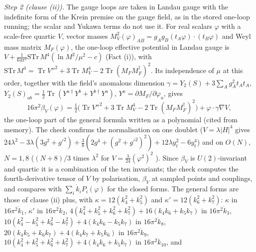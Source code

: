 \emph{Step 2 (clause (ii)).} The gauge loops are taken in Landau gauge with the indefinite form of the Krein premise  on the gauge field, as in the stored one-loop running; the scalar and Yukawa terms do not use it. For real scalars $\varphi$ with a scale-free quartic $V$, vector masses $M_{V}^{2}(\varphi)_{AB} = g_{A}g_{B}(t_{A}\varphi)\cdot(t_{B}\varphi)$ and Weyl mass matrix $M_{F}(\varphi)$, the one-loop effective potential in Landau gauge is $V + \tfrac{1}{64\pi^{2}}\mathrm{STr}\,M^{4}(\ln M^{2}/\mu^{2} - c)$ (Fact (i)), with $\mathrm{STr}\,M^{4} = \operatorname{Tr}V''^{2} + 3\operatorname{Tr}M_{V}^{4} - 2\operatorname{Tr}(M_{F}M_{F}^{\dagger})^{2}$. Its independence of $\mu$ at this order, together with the field's anomalous dimension $\gamma = Y_{2}(S) + 3\sum_{A}g_{A}^{2}t_{A}t_{A}$, $Y_{2}(S)_{ab} = \tfrac12\operatorname{Tr}(Y^{a\dagger}Y^{b} + Y^{b\dagger}Y^{a})$, $Y^{a} = \partial M_{F}/\partial\varphi_{a}$, gives
\[
16\pi^{2}\beta_{V}(\varphi) = \tfrac12\bigl(\operatorname{Tr}V''^{2} + 3\operatorname{Tr}M_{V}^{4} - 2\operatorname{Tr}(M_{F}M_{F}^{\dagger})^{2}\bigr) + \varphi\cdot\gamma\nabla V,
\]
the one-loop part of the general formula \cite{MachacekVaughn1985, LuoWangXiao2003} written as a polynomial (cited from memory). The check confirms the normalisation on one doublet ($V = \lambda|H|^{4}$ gives $24\lambda^{2} - 3\lambda(3g^{2} + g'^{2}) + \tfrac38(2g^{4} + (g^{2} + g'^{2})^{2}) + 12\lambda y_{t}^{2} - 6y_{t}^{4}$) and on $O(N)$, $N = 1, 8$ ($(N + 8)/3$ times $\lambda^{2}$ for $V = \tfrac{\lambda}{24}(\varphi^{2})^{2}$ \cite{KleinertSchulteFrohlinde2001}). Since $\beta_{V}$ is $U(2)$-invariant and quartic it is a combination of the ten invariants; the check computes the fourth-derivative tensor of $V$ by polarisation, $\beta_{V}$ at sampled points and couplings, and compares with $\sum_{i}\dot k_{i}P_{i}(\varphi)$ for the closed forms. The general forms are those of clause (ii) plus, with $\kappa = 12(k_{4}^{2} + k_{5}^{2})$ and $\kappa' = 12(k_{6}^{2} + k_{7}^{2})$: $\kappa$ in $16\pi^{2}\dot k_{1}$, $\kappa'$ in $16\pi^{2}\dot k_{2}$, $4(k_{4}^{2} + k_{5}^{2} + k_{6}^{2} + k_{7}^{2}) + 16(k_{4}k_{6} + k_{5}k_{7})$ in $16\pi^{2}\dot k_{3}$, $10(k_{4}^{2} - k_{5}^{2} + k_{6}^{2} - k_{7}^{2}) + 4(k_{4}k_{6} - k_{5}k_{7})$ in $16\pi^{2}\dot k_{8}$, $20(k_{4}k_{5} + k_{6}k_{7}) + 4(k_{4}k_{7} + k_{5}k_{6})$ in $16\pi^{2}\dot k_{9}$, $10(k_{4}^{2} + k_{5}^{2} + k_{6}^{2} + k_{7}^{2}) + 4(k_{4}k_{6} + k_{5}k_{7})$ in $16\pi^{2}\dot k_{10}$, and
